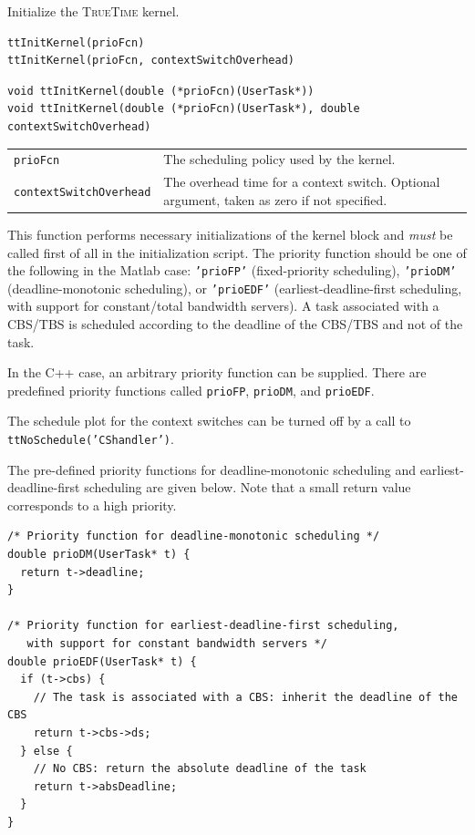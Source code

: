 \documentclass[final,twoside]{rapport}
\begin{document}
\purpose
Initialize the \textsc{TrueTime} kernel.

\Msyntax
\begin{verbatim}
ttInitKernel(prioFcn)
ttInitKernel(prioFcn, contextSwitchOverhead)
\end{verbatim}

\Csyntax
\begin{verbatim}
void ttInitKernel(double (*prioFcn)(UserTask*))
void ttInitKernel(double (*prioFcn)(UserTask*), double contextSwitchOverhead)
\end{verbatim}

\args
\begin{tabularx}{\hsize}{l>{\raggedright\arraybackslash}X}
  {\tt prioFcn} & The scheduling policy used by the kernel. \\
  {\tt contextSwitchOverhead} & The overhead time for a context switch. Optional
  argument, taken as zero if not specified.
\end{tabularx}

\descr This function performs necessary initializations of the
kernel block and \emph{must} be called first of all in the
initialization script. The priority function should be one of the
following in the Matlab case: \texttt{'prioFP'} (fixed-priority
scheduling), \texttt{'prioDM'} (deadline-monotonic scheduling), or
\texttt{'prioEDF'} (earliest-deadline-first scheduling, with support
for constant/total bandwidth servers). A task associated with a CBS/TBS is
scheduled according to the deadline of the CBS/TBS and not of the task.

In the C++ case, an arbitrary priority function can be supplied. There
are predefined priority functions called \texttt{prioFP},
\texttt{prioDM}, and \texttt{prioEDF}.

The schedule plot for the context switches can be turned off by a call
to \texttt{ttNoSchedule('CShandler')}.

\example The pre-defined priority functions
for deadline-monotonic scheduling and earliest-deadline-first
scheduling are given below. Note that a small return value corresponds
to a high priority.

\begin{footnotesize}
\begin{verbatim}
/* Priority function for deadline-monotonic scheduling */
double prioDM(UserTask* t) {
  return t->deadline;
}

/* Priority function for earliest-deadline-first scheduling,
   with support for constant bandwidth servers */
double prioEDF(UserTask* t) {
  if (t->cbs) {
    // The task is associated with a CBS: inherit the deadline of the CBS
    return t->cbs->ds;
  } else {
    // No CBS: return the absolute deadline of the task
    return t->absDeadline;
  }
}
\end{verbatim}
\end{footnotesize}
\end{document}
